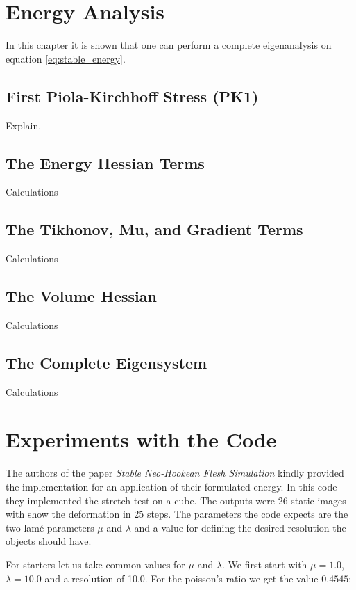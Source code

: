 \section{Energy Analysis}
In this chapter it is shown that one can perform a complete eigenanalysis on equation \ref{eq:stable_energy}.

\subsection{First Piola-Kirchhoff Stress (PK1)}
Explain.

\subsection{The Energy Hessian Terms}
Calculations

\subsection{The Tikhonov, Mu, and Gradient Terms}
Calculations

\subsection{The Volume Hessian}
Calculations
 
\subsection{The Complete Eigensystem}
Calculations

\section{Experiments with the Code}
The authors of the paper \textit{Stable Neo-Hookean Flesh Simulation} \cite{Smith:2018:SNF:3191713.3180491} kindly provided the implementation for an application of their formulated energy. In this code they implemented the stretch test on a cube. The outputs were 26 static images with show the deformation in 25 steps. The parameters the code expects are the two lamé parameters $\mu$ and $\lambda$ and a value for defining the desired resolution the objects should have.


For starters let us take common values for $\mu$ and $\lambda$. We first start with $\mu = 1.0$, $\lambda = 10.0$ and a resolution of 10.0. For the poisson's ratio we get the value $0.4545$:

